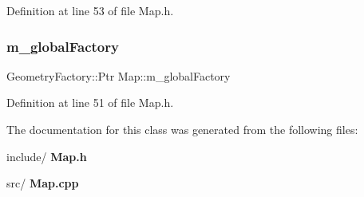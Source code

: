 Definition at line 53 of file Map.\+h.

\mbox{\label{class_map_ac5f30e6c144955a3638192495fd7d843}} 
\subsubsection{m\_globalFactory}
{\footnotesize\ttfamily Geometry\+Factory\+::\+Ptr Map\+::m\+\_\+global\+Factory\hspace{0.3cm}{\ttfamily [private]}}



Definition at line 51 of file Map.\+h.



The documentation for this class was generated from the following files\+:\begin{DoxyCompactItemize}
\item 
include/\textbf{ Map.\+h}\item 
src/\textbf{ Map.\+cpp}\end{DoxyCompactItemize}
